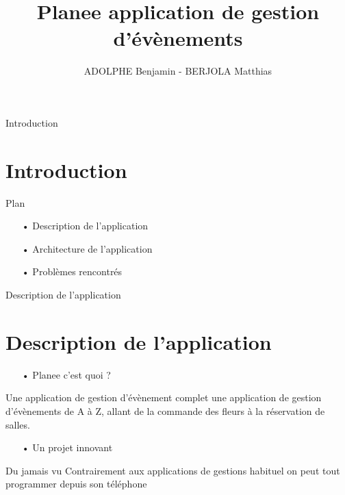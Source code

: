 \documentclass[11pt]{beamer}
\author{ADOLPHE Benjamin - BERJOLA Matthias}
\institute{Université de la Réunion}
\begin{document}
\begin{frame}
\title{Planee application de gestion d'évènements}
\titlepage
\end{frame}



\begin{frame}{Introduction}
\section{Introduction}

\begin{itemize}


\end{itemize}

\end{frame}






\begin{frame}{Plan}
\begin{itemize}
\item[•] Description de l'application  \pause
\item[•] Architecture de l'application \pause
\item[•] Problèmes rencontrés  

\end{itemize}
\end{frame}



\begin{frame}{Description de l'application}
\section{Description de l'application}
\begin{itemize}
\item[•] Planee c'est quoi ? \pause
\end{itemize}
\begin{mybox}{Une application de gestion d'évènement complet}
une application de gestion d'évènements de A à Z, allant de la commande des fleurs à la réservation de salles.
	
\end{mybox}
\pause
\begin{itemize}
\item[•] Un projet innovant \pause
\end{itemize}
\begin{mybox}{Du jamais vu}
Contrairement aux applications de gestions habituel on peut tout programmer depuis son téléphone 
	
\end{mybox}



\end{frame}
\end{document}
